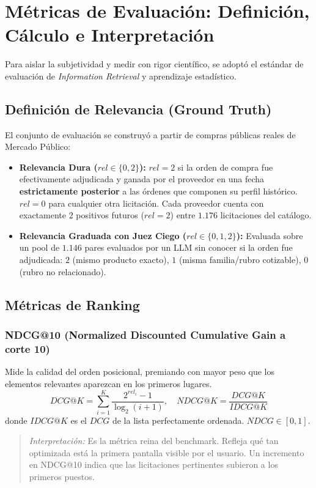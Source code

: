 \documentclass[11pt,a4paper]{article}
\begin{document}
\section{Métricas de Evaluación: Definición, Cálculo e Interpretación}

Para aislar la subjetividad y medir con rigor científico, se adoptó el estándar de evaluación de \textit{Information Retrieval} y aprendizaje estadístico.

\subsection{Definición de Relevancia (Ground Truth)}
El conjunto de evaluación se construyó a partir de compras públicas reales de Mercado Público:
\begin{itemize}[leftmargin=*]
    \item \textbf{Relevancia Dura ($rel \in \{0, 2\}$):} $rel = 2$ si la orden de compra fue efectivamente adjudicada y ganada por el proveedor en una fecha \textbf{estrictamente posterior} a las órdenes que componen su perfil histórico. $rel = 0$ para cualquier otra licitación. Cada proveedor cuenta con exactamente 2 positivos futuros ($rel=2$) entre $1.176$ licitaciones del catálogo.
    \item \textbf{Relevancia Graduada con Juez Ciego ($rel \in \{0, 1, 2\}$):} Evaluada sobre un pool de $1.146$ pares evaluados por un LLM sin conocer si la orden fue adjudicada: $2$ (mismo producto exacto), $1$ (misma familia/rubro cotizable), $0$ (rubro no relacionado).
\end{itemize}

\subsection{Métricas de Ranking}

\subsubsection{NDCG@10 (Normalized Discounted Cumulative Gain a corte 10)}
Mide la calidad del orden posicional, premiando con mayor peso que los elementos relevantes aparezcan en los primeros lugares.
\begin{equation}
    DCG@K = \sum_{i=1}^{K} \frac{2^{rel_i} - 1}{\log_2(i + 1)}, \quad NDCG@K = \frac{DCG@K}{IDCG@K}
\end{equation}
donde $IDCG@K$ es el $DCG$ de la lista perfectamente ordenada. $NDCG \in [0, 1]$.
\begin{quote}
\textit{Interpretación:} Es la métrica reina del benchmark. Refleja qué tan optimizada está la primera pantalla visible por el usuario. Un incremento en NDCG@10 indica que las licitaciones pertinentes subieron a los primeros puestos.
\end{quote}
\end{document}
